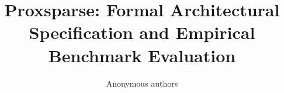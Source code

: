 \title{\textbf{Proxsparse: Formal Architectural Specification and Empirical Benchmark Evaluation}}

\author{Anonymous authors}
